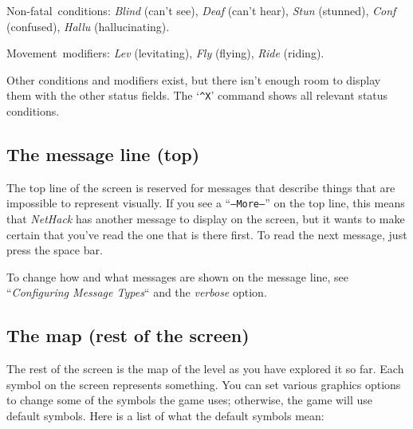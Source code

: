 Non-fatal~conditions:
{\it Blind\/} (can't see), {\it Deaf\/} (can't hear),
{\it Stun\/} (stunned), {\it Conf\/} (confused), {\it Hallu\/} (hallucinating).

Movement~modifiers:
{\it Lev\/} (levitating), {\it Fly\/} (flying), {\it Ride\/} (riding).

Other conditions and modifiers exist, but there isn't enough room to
display them with the other status fields.  The `{\tt \^{}X}' command shows
all relevant status conditions.
\elist

\subsection*{The message line (top)}

The top line of the screen is reserved for messages that describe
things that are impossible to represent visually.  If you see a
``{\tt --More--}'' on the top line, this means that {\it NetHack\/} has
another message to display on the screen, but it wants to make certain
that you've read the one that is there first.  To read the next message,
just press the space bar.

To change how and what messages are shown on the message line,
see ``{\it Configuring Message Types\/}`` and the {\it verbose\/}
option.

\subsection*{The map (rest of the screen)}

The rest of the screen is the map of the level as you have explored it
so far.  Each symbol on the screen represents something.  You can set
various graphics
options to change some of the symbols the game uses; otherwise, the
game will use default symbols.  Here is a list of what the default
symbols mean:

